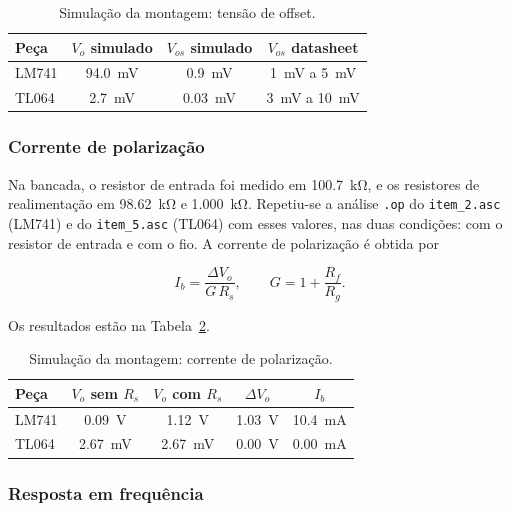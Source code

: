 \documentclass[11pt,a4paper]{article}
\begin{document}
\begin{table}[h]
\centering
\caption{Simulação da montagem: tensão de offset.}
\label{tab:offset_sim_bancada}
\begin{tabular}{lccc}
\hline
Peça & $V_o$ simulado & $V_{os}$ simulado & $V_{os}$ datasheet \\
\hline
LM741 & \SI{94,0}{\milli\volt} & \SI{0,9}{\milli\volt} & \SI{1}{\milli\volt} a \SI{5}{\milli\volt} \\
TL064 & \SI{2,7}{\milli\volt} & \SI{0,03}{\milli\volt} & \SI{3}{\milli\volt} a \SI{10}{\milli\volt} \\
\hline
\end{tabular}
\end{table}

\subsubsection{Corrente de polarização}

Na bancada, o resistor de entrada foi medido em \SI{100,7}{\kilo\ohm}, e os resistores de realimentação em \SI{98,62}{\kilo\ohm} e \SI{1,000}{\kilo\ohm}. Repetiu-se a análise \texttt{.op} do \texttt{item\_2.asc} (LM741) e do \texttt{item\_5.asc} (TL064) com esses valores, nas duas condições: com o resistor de entrada e com o fio. A corrente de polarização é obtida por

\begin{equation}
I_b = \frac{\Delta V_o}{G \, R_s} , \qquad G = 1 + \frac{R_f}{R_g} .
\label{eq:ib_sim_bancada}
\end{equation}

Os resultados estão na Tabela~\ref{tab:ib_sim_bancada}.

\begin{table}[h]
\centering
\caption{Simulação da montagem: corrente de polarização.}
\label{tab:ib_sim_bancada}
\begin{tabular}{lcccc}
\hline
Peça & $V_o$ sem $R_s$ & $V_o$ com $R_s$ & $\Delta V_o$ & $I_b$ \\
\hline
LM741 & \SI{0,09}{\volt} & \SI{1,12}{\volt} & \SI{1,03}{\volt} & \SI{10,4}{\milli\ampere} \\
TL064 & \SI{2,67}{\milli\volt} & \SI{2,67}{\milli\volt} & \SI{0,00}{\volt} & \SI{0,00}{\milli\ampere} \\
\hline
\end{tabular}
\end{table}

\subsubsection{Resposta em frequência}
\end{document}
